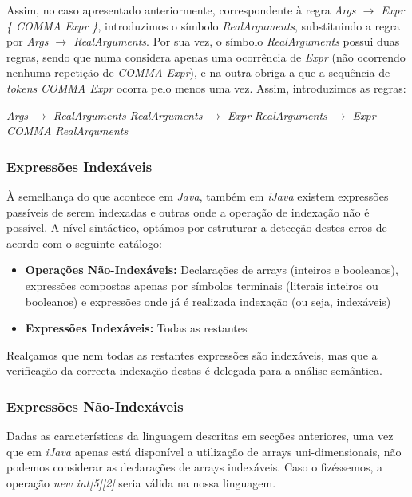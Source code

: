 \documentclass[11pt,a4paper]{article}
\begin{document}
Assim, no caso apresentado anteriormente, correspondente à regra \emph{Args $\rightarrow$ Expr \{ COMMA Expr \}}, introduzimos o símbolo \emph{RealArguments}, substituindo a regra por \emph{Args $\rightarrow$ RealArguments}. Por sua vez, o símbolo \emph{RealArguments} possui duas regras, sendo que numa considera apenas uma ocorrência de \emph{Expr} (não ocorrendo nenhuma repetição de \emph{COMMA Expr}), e na outra obriga a que a sequência de \emph{tokens} \emph{COMMA Expr} ocorra pelo menos uma vez. Assim, introduzimos as regras:

\emph{Args $\rightarrow$ RealArguments}
\emph{RealArguments $\rightarrow$ Expr}
\emph{RealArguments $\rightarrow$ Expr COMMA RealArguments}

\subsubsection{Expressões Indexáveis}

À semelhança do que acontece em \emph{Java}, também em \emph{iJava} existem expressões passíveis de serem indexadas e outras onde a operação de indexação não é possível. A nível sintáctico, optámos por estruturar a detecção destes erros de acordo com o seguinte catálogo:

\begin{itemize}
\item \textbf{Operações Não-Indexáveis:} Declarações de arrays (inteiros e booleanos), expressões compostas apenas por símbolos terminais (literais inteiros ou booleanos) e expressões onde já é realizada indexação (ou seja, indexáveis)

\item \textbf{Expressões Indexáveis:} Todas as restantes
\end{itemize}

Realçamos que nem todas as restantes expressões são indexáveis, mas que a verificação da correcta indexação destas é delegada para a análise semântica.

\subsubsection{Expressões Não-Indexáveis}

Dadas as características da linguagem descritas em secções anteriores, uma vez que em \emph{iJava} apenas está disponível a utilização de arrays uni-dimensionais, não podemos considerar as declarações de arrays indexáveis. Caso o fizéssemos, a operação \emph{new int[5][2]} seria válida na nossa linguagem.
\end{document}
